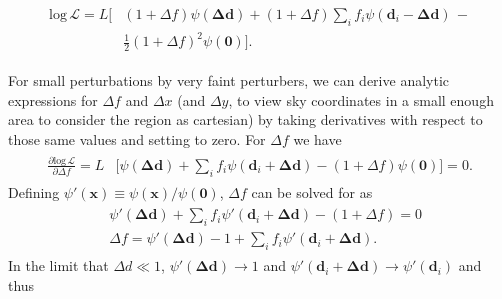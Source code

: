 \documentclass[fleqn,usenatbib]{mnras}
\begin{document}
\begin{align}
\begin{split}
    \mathrm{log}\,\mathcal{L} = L \bigg[&(1 + \Delta f)\psi(\mathbf{\Delta d}) + (1 + \Delta f)\sum\limits_if_i\psi(\mathbf{d}_i - \mathbf{\Delta d})\,-\\&\frac{1}{2}(1 + \Delta f)^2\psi(\mathbf{0})\Bigg].
\end{split}
\end{align}

For small perturbations by very faint perturbers, we can derive analytic expressions for $\Delta f$ and $\Delta x$ (and $\Delta y$, to view sky coordinates in a small enough area to consider the region as cartesian) by taking derivatives with respect to those same values and setting to zero. For $\Delta f$ we have
\begin{align}
\begin{split}
    \frac{\partial\mathrm{log}\,\mathcal{L}}{\partial \Delta f} = L &\bigg[\psi(\mathbf{\Delta d}) + \sum\limits_if_i\psi(\mathbf{d}_i + \mathbf{\Delta d}) - (1 + \Delta f)\psi(\mathbf{0})\bigg] = 0.
\end{split}
\end{align}
Defining $\psi{'}(\mathbf{x}) \equiv \psi(\mathbf{x})/\psi(\mathbf{0})$, $\Delta f$ can be solved for as
\begin{align}
\begin{split}
    &\psi{'}(\mathbf{\Delta d}) + \sum\limits_if_i\psi{'}(\mathbf{d}_i + \mathbf{\Delta d}) - (1 + \Delta f) = 0\\
    &\Delta f = \psi{'}(\mathbf{\Delta d}) - 1 + \sum\limits_if_i\psi{'}(\mathbf{d}_i + \mathbf{\Delta d}).
\label{eq:dfderiv}
\end{split}
\end{align}
In the limit that $\Delta d \ll 1$, $\psi{'}(\mathbf{\Delta d}) \to 1$ and $\psi{'}(\mathbf{d}_i + \mathbf{\Delta d}) \to \psi{'}(\mathbf{d}_i)$ and thus
\end{document}
